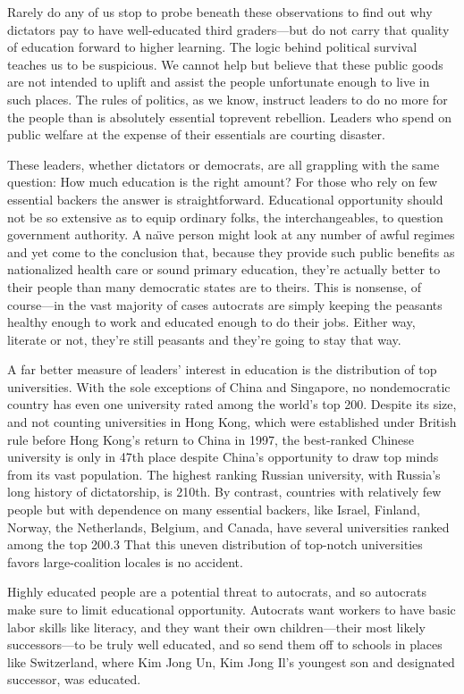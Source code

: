 \documentclass[10pt]{article}
\begin{document}
{\large Rarely do any of us stop to probe beneath these observations to find out
why dictators pay to have well-educated third graders---but do not carry that
quality of education forward to higher learning. The logic behind political
survival teaches us to be suspicious. We cannot help but believe that these
public goods are not intended to uplift and assist the people unfortunate enough
to live in such places. The rules of politics, as we know, instruct leaders to do
no more for the people than is absolutely essential toprevent rebellion. Leaders
who spend on public welfare at the expense of their essentials are courting
disaster.}

{\large These leaders, whether dictators or democrats, are all grappling with
the same question: How much education is the right amount? For those who rely on
few essential backers the answer is straightforward. Educational opportunity
should not be so extensive as to equip ordinary folks, the interchangeables, to
question government authority. A na\"{\i}ve person might look at any number of
awful regimes and yet come to the conclusion that, because they provide such
public benefits as nationalized health care or sound primary education, they're
actually better to their people than many democratic states are to theirs. This
is nonsense, of course---in the vast majority of cases autocrats are simply
keeping the peasants healthy enough to work and educated enough to do their jobs.
Either way, literate or not, they're still peasants and they're going to stay
that way.}

{\large A far better measure of leaders' interest in education is the
distribution of top universities. With the sole exceptions of China and
Singapore, no nondemocratic country has even one university rated among the
world's top 200. Despite its size, and not counting universities in Hong Kong,
which were established under British rule before Hong Kong's return to China in
1997, the best-ranked Chinese university is only in 47th place despite China's
opportunity to draw top minds from its vast population. The highest ranking
Russian university, with Russia's long history of dictatorship, is 210th. By
contrast, countries with relatively few people but with dependence on many
essential backers, like Israel, Finland, Norway, the Netherlands, Belgium, and
Canada, have several universities ranked among the top 200.3 That this uneven
distribution of top-notch universities favors large-coalition locales is no
accident.}

{\large Highly educated people are a potential threat to autocrats, and so
autocrats make sure to limit educational opportunity. Autocrats want workers to
have basic labor skills like literacy, and they want their own children---their
most likely successors---to be truly well educated, and so send them off to
schools in places like Switzerland, where Kim Jong Un, Kim Jong Il's youngest son
and designated successor, was educated.}
\end{document}
